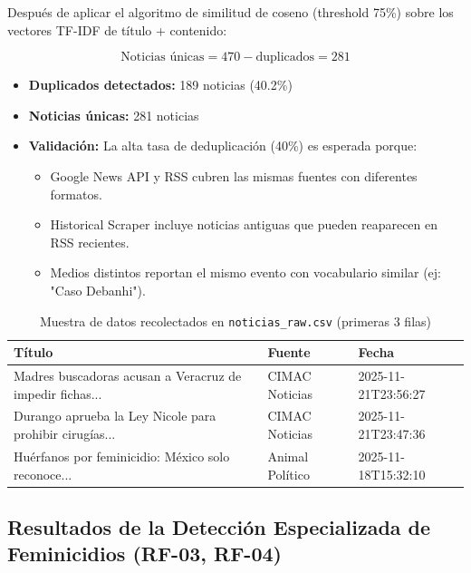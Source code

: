 Después de aplicar el algoritmo de similitud de coseno (threshold 75\%) sobre los vectores TF-IDF de título + contenido:

\begin{equation}
\text{Noticias únicas} = 470 - \text{duplicados} = 281
\end{equation}

\begin{itemize}
    \item \textbf{Duplicados detectados:} 189 noticias (40.2\%)
    \item \textbf{Noticias únicas:} 281 noticias
    \item \textbf{Validación:} La alta tasa de deduplicación (40\%) es esperada porque:
    \begin{itemize}
        \item Google News API y RSS cubren las mismas fuentes con diferentes formatos.
        \item Historical Scraper incluye noticias antiguas que pueden reaparecen en RSS recientes.
        \item Medios distintos reportan el mismo evento con vocabulario similar (ej: "Caso Debanhi").
    \end{itemize}
\end{itemize}

\begin{table}[h]
    \centering
    \caption{Muestra de datos recolectados en \texttt{noticias\_raw.csv} (primeras 3 filas)}
    \label{tab:datos_raw}
    \begin{tabular}{|p{5cm}|l|l|}
        \hline
        \textbf{Título} & \textbf{Fuente} & \textbf{Fecha} \\ \hline
        Madres buscadoras acusan a Veracruz de impedir fichas... & CIMAC Noticias & 2025-11-21T23:56:27 \\ \hline
        Durango aprueba la Ley Nicole para prohibir cirugías... & CIMAC Noticias & 2025-11-21T23:47:36 \\ \hline
        Huérfanos por feminicidio: México solo reconoce... & Animal Político & 2025-11-18T15:32:10 \\ \hline
    \end{tabular}
\end{table}

\subsection{Resultados de la Detección Especializada de Feminicidios (RF-03, RF-04)}
\label{subsec:resultados_detector}

